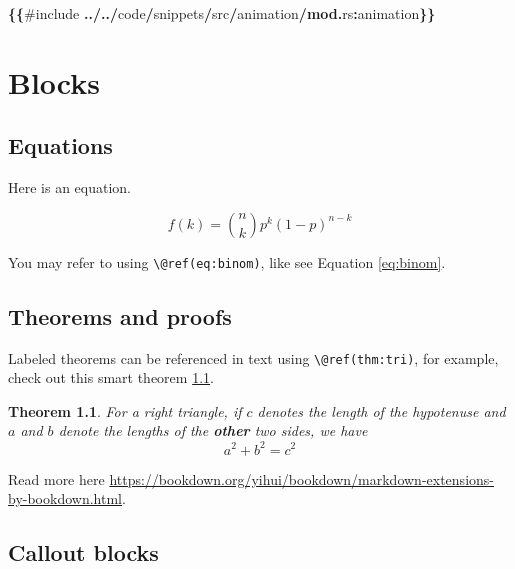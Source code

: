 \documentclass[
]{book}
\newenvironment{Shaded}{\begin{snugshade}}{\end{snugshade}}
\newcommand{\KeywordTok}[1]{\textcolor[rgb]{0.13,0.29,0.53}{\textbf{#1}}}
\newcommand{\NormalTok}[1]{#1}
\newcommand{\OperatorTok}[1]{\textcolor[rgb]{0.81,0.36,0.00}{\textbf{#1}}}
\newtheorem{theorem}{Theorem}[chapter]
\theoremstyle{definition}
\theoremstyle{definition}
\theoremstyle{definition}
\theoremstyle{definition}
\theoremstyle{remark}
\begin{document}
\begin{Shaded}
\begin{Highlighting}[]
\OperatorTok{\{\{}\NormalTok{\#include }\OperatorTok{../../}\NormalTok{code}\OperatorTok{/}\NormalTok{snippets}\OperatorTok{/}\NormalTok{src}\OperatorTok{/}\NormalTok{animation}\OperatorTok{/}\KeywordTok{mod}\OperatorTok{.}\NormalTok{rs}\OperatorTok{:}\NormalTok{animation}\OperatorTok{\}\}}
\end{Highlighting}
\end{Shaded}

\chapter{Blocks}\label{blocks}

\section{Equations}\label{equations}

Here is an equation.

\begin{equation} 
  f\left(k\right) = \binom{n}{k} p^k\left(1-p\right)^{n-k}
  \label{eq:binom}
\end{equation}

You may refer to using \texttt{\textbackslash{}@ref(eq:binom)}, like see Equation \eqref{eq:binom}.

\section{Theorems and proofs}\label{theorems-and-proofs}

Labeled theorems can be referenced in text using \texttt{\textbackslash{}@ref(thm:tri)}, for example, check out this smart theorem \ref{thm:tri}.

\begin{theorem}
\protect\hypertarget{thm:tri}{}\label{thm:tri}For a right triangle, if \(c\) denotes the \emph{length} of the hypotenuse
and \(a\) and \(b\) denote the lengths of the \textbf{other} two sides, we have
\[a^2 + b^2 = c^2\]
\end{theorem}

Read more here \url{https://bookdown.org/yihui/bookdown/markdown-extensions-by-bookdown.html}.

\section{Callout blocks}\label{callout-blocks}
\end{document}
